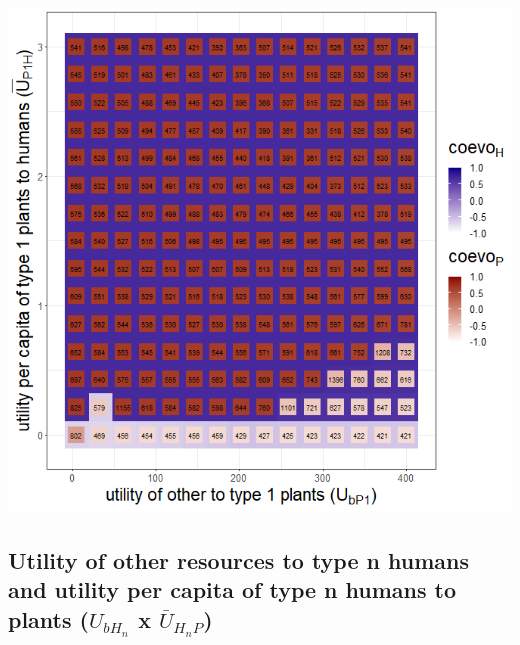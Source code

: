 \documentclass[
]{book}
\begin{document}
\includegraphics[width=1\linewidth]{plots/3_exp_type_1_plants_traits-tripleRaster_twoParameters}

\newpage

\hypertarget{utility-of-other-resources-to-type-n-humans-and-utility-per-capita-of-type-n-humans-to-plants-u_bh_n-x-baru_h_np}{%
\subsection{\texorpdfstring{Utility of other resources to type n humans and utility per capita of type n humans to plants (\(U_{bH_{n}}\) x \(\bar{U}_{H_{n}P}\))}{Utility of other resources to type n humans and utility per capita of type n humans to plants (U\_\{bH\_\{n\}\} x \textbackslash bar\{U\}\_\{H\_\{n\}P\})}}\label{utility-of-other-resources-to-type-n-humans-and-utility-per-capita-of-type-n-humans-to-plants-u_bh_n-x-baru_h_np}}
\end{document}
